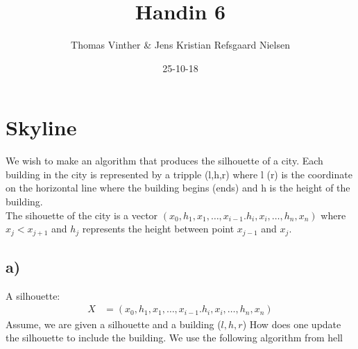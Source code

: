 \documentclass{article}
\theoremstyle{remark}
\numberwithin{equation}{section}
\begin{document}
	\author{Thomas Vinther \& Jens Kristian Refsgaard Nielsen}
	\title{Handin 6}
	\date{25-10-18}
	\maketitle
	\section{Skyline}
	We wish to make an algorithm that produces the silhouette of a city. Each building in the city is represented by a tripple (l,h,r) where l (r) is the coordinate on the horizontal line where the building begins (ends) and h is the height of the building.
	\\The sihouette of the city is a vector $(x_0,h_1,x_1,\dots,x_{i-1}.h_i,x_i,\dots,h_n,x_n)$ where $x_j<x_{j+1}$ and $h_j$ represents the height between point $x_{j-1}$ and $x_j$.
	\subsection{a)}
	A silhouette: %
	\begin{align}
	X&=(x_0,h_1,x_1,\dots,x_{i-1}.h_i,x_i,\dots,h_n,x_n)
	\end{align}
	Assume, we are given a silhouette and a building ($l,h,r$) How does one update the silhouette to include the building.
	We use the following algorithm from hell\\
	
\end{document}
